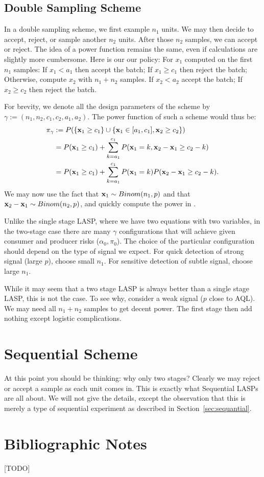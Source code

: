 \subsection{Double Sampling Scheme}
In a double sampling scheme, we first example $n_1$ units. 
We may then decide to accept, reject, or sample another $n_2$ units. 
After those $n_2$ samples, we can accept or reject. 
The idea of a power function remains the same, even if calculations are slightly more cumbersome.
Here is our our policy:
For $x_1$ computed on the first $n_1$ samples:
If $x_1  < a_1$ then accept the batch;
If $x_1 \geq  c_1$ then reject the batch;
Otherwise, compute $x_2$ with $n_1+n_2$ samples.
If $x_2 < a_2$ accept the batch;
If $x_2 \geq c_2$ then reject the batch.

For brevity, we denote all the design parameters of the scheme by $\gamma:= (n_1,n_2,c_1,c_2,a_1,a_2)$. 
The power function of such a scheme would thus be:
\begin{align}
	\pi_\gamma &:= P(\{ \mathbf{x}_1 \geq c_1 \} \cup \{ \mathbf{x}_1 \in [a_1,c_1], \mathbf{x}_2 \geq c_2 \}) \\
	&= P(\mathbf{x}_1 \geq c_1) + \sum_{k=a_1}^{c_1} P(\mathbf{x}_1 =k, \mathbf{x}_2-\mathbf{x}_1 \geq c_2-k) \\
		&= P(\mathbf{x}_1 \geq c_1) + \sum_{k=a_1}^{c_1} P(\mathbf{x}_1 =k) P(\mathbf{x}_2-\mathbf{x}_1 \geq c_2-k).
\end{align}
We may now use the fact that $\mathbf{x}_1 \sim Binom(n_1,p)$ and that $\mathbf{x}_2-\mathbf{x}_1 \sim Binom(n_2,p)$, and quickly compute the power in \R.

\begin{remark}[Redundancy]
Unlike the single stage LASP, where we have two equations with two variables, in the two-stage case there are many $\gamma$ configurations that will achieve given consumer and producer risks ($\alpha_0,\pi_0$).
The choice of the particular configuration should depend on the type of signal we expect. 
For quick detection of strong signal (large $p$), choose small $n_1$. 
For sensitive detection of subtle signal, choose large $n_1$. 
\end{remark}

\begin{remark}
While it may seem that a two stage LASP is always better than a single stage LASP, this is not the case.
To see why, consider a weak signal ($p$ close to AQL). We may need all $n_1+n_2$ samples to get decent power. The first stage then add nothing except logistic complications.
\end{remark}


\section{Sequential Scheme}
At this point you should be thinking: why only two stages? 
Clearly we may reject or accept a sample as each unit comes in.
This is exactly what Sequential LASPs are all about.
We will not give the details, except the observation that this is merely a type of sequential experiment as described in Section~\ref{sec:sequantial}.




\section{Bibliographic Notes}
[TODO]
